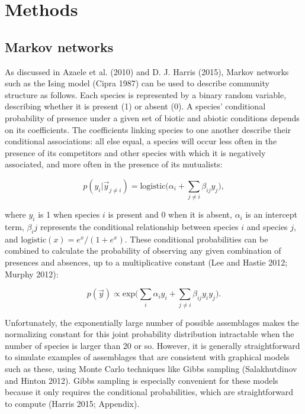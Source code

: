 \section{Methods}\label{methods}

\subsection{Markov networks}\label{markov-networks}

As discussed in Azaele et al. (2010) and D. J. Harris (2015), Markov
networks such as the Ising model (Cipra 1987) can be used to describe
community structure as follows. Each species is represented by a binary
random variable, describing whether it is present (1) or absent (0). A
species' conditional probability of presence under a given set of biotic
and abiotic conditions depends on its coefficients. The coefficients
linking species to one another describe their conditional associations:
all else equal, a species will occur less often in the presence of its
competitors and other species with which it is negatively associated,
and more often in the presence of its mutualists:

\[ p(y_i | \vec{y}_{j \neq i}) = \mathrm{logistic}\Big(\alpha_i + \sum_{j \neq i}{\beta_{ij}y_j}\Big), \]

where \(y_i\) is 1 when species \(i\) is present and 0 when it is
absent, \(\alpha_i\) is an intercept term, \(\beta_ij\) represents the
conditional relationship between species \(i\) and species \(j\), and
\(\mathrm{logistic}(x) = e^x / (1 + e^x)\). These conditional
probabilities can be combined to calculate the probability of observing
any given combination of presences and absences, up to a multiplicative
constant (Lee and Hastie 2012; Murphy 2012):

\[p(\vec{y}) \propto \mathrm{exp}\Big({\sum_{i}{\alpha_i y_i} + \sum_{j \neq i}}{\beta_{ij} y_i y_j}\Big).\]

Unfortunately, the exponentially large number of possible assemblages
makes the normalizing constant for this joint probability distribution
intractable when the number of species is larger than 20 or so. However,
it is generally straightforward to simulate examples of assemblages that
are consistent with graphical models such as these, using Monte Carlo
techniques like Gibbs sampling (Salakhutdinov and Hinton 2012). Gibbs
sampling is especially convenient for these models because it only
requires the conditional probabilities, which are straightforward to
compute (Harris 2015; Appendix).

